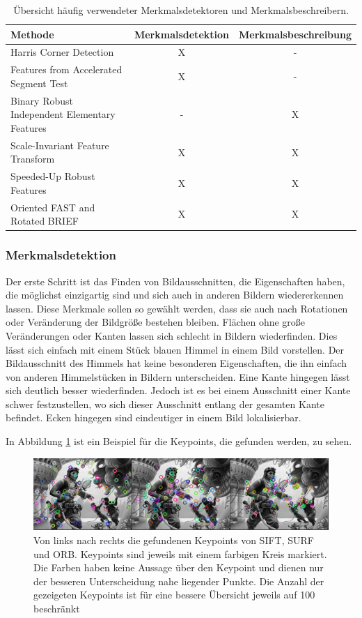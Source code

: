 \begin{table}
\centering
	\begin{tabular}{  l c c   }
	  Methode & Merkmalsdetektion & Merkmalsbeschreibung \\
	  \midrule
	  Harris Corner Detection & X & - \\
	  Features from Accelerated Segment Test & X & - \\
	  Binary Robust Independent Elementary Features & - & X \\
	  Scale-Invariant Feature Transform & X & X \\
	  Speeded-Up Robust Features & X & X \\
	  Oriented FAST and Rotated BRIEF & X & X \\
	  
	\end{tabular}
\caption{Übersicht häufig verwendeter Merkmalsdetektoren und Merkmalsbeschreibern.}
\label{table:featureMethods}
\end{table}

\subsubsection{Merkmalsdetektion}
\label{sec:featureDetection}
Der erste Schritt ist das Finden von Bildausschnitten, die Eigenschaften haben, die möglichst einzigartig sind und sich auch in anderen Bildern wiedererkennen lassen. Diese Merkmale sollen so gewählt werden, dass sie auch nach Rotationen oder Veränderung der Bildgröße bestehen bleiben. Flächen ohne große Veränderungen oder Kanten lassen sich schlecht in Bildern wiederfinden.
Dies lässt sich einfach mit einem Stück blauen Himmel in einem Bild vorstellen. Der Bildausschnitt des Himmels hat keine besonderen Eigenschaften, die ihn einfach von anderen Himmelstücken in Bildern unterscheiden.
Eine Kante hingegen lässt sich deutlich besser wiederfinden. Jedoch ist es bei einem Ausschnitt einer Kante schwer festzustellen, wo sich dieser Ausschnitt entlang der gesamten Kante befindet.
Ecken hingegen sind eindeutiger in einem Bild lokalisierbar.

In Abbildung \ref{fig:featureSample} ist ein Beispiel für die Keypoints, die gefunden werden, zu sehen.

\begin{figure}[h]

    \centering
		\includegraphics[scale=0.8]{bilder/featureSample.png}
    	\caption{Von links nach rechts die gefundenen Keypoints von SIFT, SURF und ORB. Keypoints sind jeweils mit einem farbigen Kreis markiert. Die Farben haben keine Aussage über den Keypoint und dienen nur der besseren Unterscheidung nahe liegender Punkte. Die Anzahl der gezeigeten Keypoints ist für eine bessere Übersicht jeweils auf 100 beschränkt}
\label{fig:featureSample}
\end{figure}

